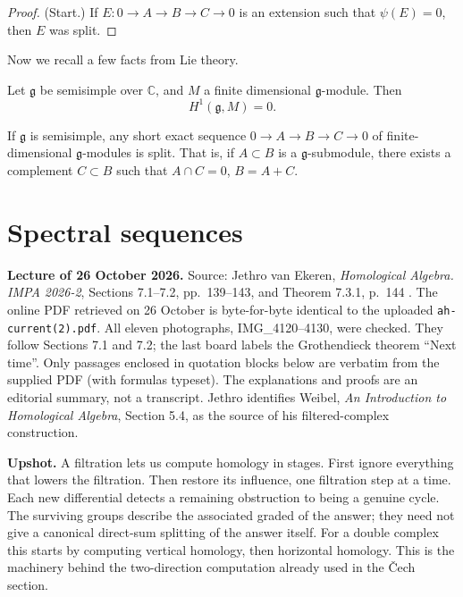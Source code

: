 \begin{proof}
(Start.) If $E: 0 \to A \to B \to C \to 0$
is an extension such that $\psi(E) = 0$,
then $E$ was split.
\end{proof}

\noindent
Now we recall a few facts from Lie theory.

\begin{theorem}[Whitehead]
\label{theorem-whitehead}
Let $\mathfrak{g}$ be semisimple over
$\mathbb{C}$, and $M$ a finite dimensional
$\mathfrak{g}$-module. Then
$$
H^1(\mathfrak{g},M)=0.
$$
\end{theorem}

\begin{corollary}
\label{lemma-g-modules-ses-split}
If $\mathfrak{g}$ is semisimple, any short
exact sequence 
$0 \to A \to B \to C \to 0$
of finite-dimensional
$\mathfrak{g}$-modules is split. That is,
if $A \subset B$ is a
$\mathfrak{g}$-submodule,
there exists a complement $C \subset B$
such that $A \cap C = 0$,
$B = A + C$.
\end{corollary}

\section{Spectral sequences}
\label{section-spectral-sequences}

\noindent
{\bf Lecture of 26 October 2026.}
Source: Jethro van Ekeren,
\emph{Homological Algebra. IMPA 2026-2},
Sections 7.1--7.2, pp.~139--143, and
Theorem 7.3.1, p.~144
\cite{vanEkerenHomologicalAlgebra2026}.
The online PDF retrieved on 26 October
is byte-for-byte identical to the uploaded
\texttt{ah-current(2).pdf}.
All eleven photographs, IMG\_4120--4130,
were checked. They follow Sections 7.1
and 7.2; the last board labels the
Grothendieck theorem ``Next time''.
Only passages enclosed in quotation
blocks below are verbatim from the
supplied PDF (with formulas typeset).
The explanations and proofs are an
editorial summary, not a transcript.
Jethro identifies Weibel,
\emph{An Introduction to Homological
Algebra}, Section 5.4, as the source
of his filtered-complex construction.

\medskip\noindent
{\bf Upshot.}
A filtration lets us compute homology
in stages. First ignore everything that
lowers the filtration. Then restore its
influence, one filtration step at a time.
Each new differential detects a remaining
obstruction to being a genuine cycle.
The surviving groups describe the
associated graded of the answer; they
need not give a canonical direct-sum
splitting of the answer itself.
For a double complex this starts by
computing vertical homology, then
horizontal homology. This is the machinery
behind the two-direction computation
already used in the \v{C}ech section.



